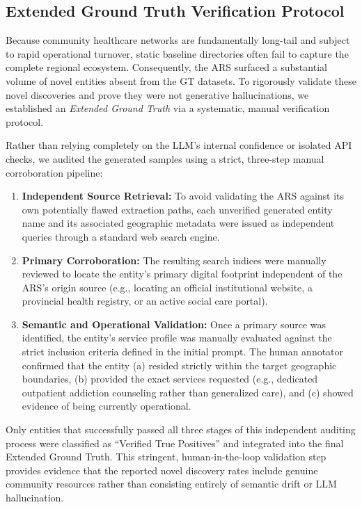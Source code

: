 \documentclass[12pt,oneside]{report}
\begin{document}
\subsection{Extended Ground Truth Verification Protocol}

Because community healthcare networks are fundamentally long-tail and subject to rapid operational turnover, static baseline directories often fail to capture the complete regional ecosystem. Consequently, the ARS surfaced a substantial volume of novel entities absent from the GT datasets. To rigorously validate these novel discoveries and prove they were not generative hallucinations, we established an \textit{Extended Ground Truth} via a systematic, manual verification protocol. 

Rather than relying completely on the LLM's internal confidence or isolated API checks, we audited the generated samples using a strict, three-step manual corroboration pipeline:

\begin{enumerate}
    \item \textbf{Independent Source Retrieval:} To avoid validating the ARS against its own potentially flawed extraction paths, each unverified generated entity name and its associated geographic metadata were issued as independent queries through a standard web search engine. 
    \item \textbf{Primary Corroboration:} The resulting search indices were manually reviewed to locate the entity's primary digital footprint independent of the ARS's origin source (e.g., locating an official institutional website, a provincial health registry, or an active social care portal).
    \item \textbf{Semantic and Operational Validation:} Once a primary source was identified, the entity's service profile was manually evaluated against the strict inclusion criteria defined in the initial prompt. The human annotator confirmed that the entity (a) resided strictly within the target geographic boundaries, (b) provided the exact services requested (e.g., dedicated outpatient addiction counseling rather than generalized care), and (c) showed evidence of being currently operational.
\end{enumerate}

Only entities that successfully passed all three stages of this independent auditing process were classified as ``Verified True Positives'' and integrated into the final Extended Ground Truth. This stringent, human-in-the-loop validation step provides evidence that the reported novel discovery rates include genuine community resources rather than consisting entirely of semantic drift or LLM hallucination.
\end{document}
